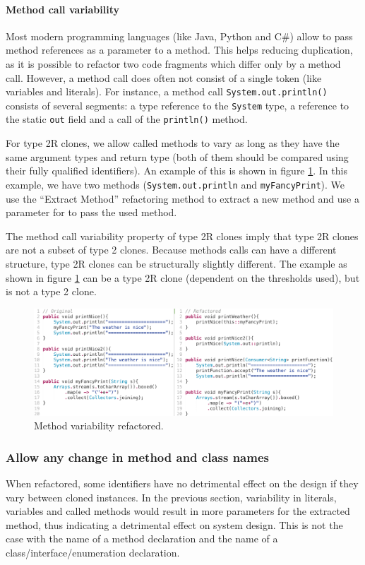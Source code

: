 \paragraph{Method call variability}
Most modern programming languages (like Java, Python and C\#) allow to pass method references as a parameter to a method. This helps reducing duplication, as it is possible to refactor two code fragments which differ only by a method call. However, a method call does often not consist of a single token (like variables and literals). For instance, a method call \texttt{System.out.println()} consists of several segments: a type reference to the \texttt{System} type, a reference to the static \texttt{out} field and a call of the \texttt{println()} method.

For type 2R clones, we allow called methods to vary as long as they have the same argument types and return type (both of them should be compared using their fully qualified identifiers). An example of this is shown in figure \ref{fig:type2method}. In this example, we have two methods (\texttt{System.out.println} and \texttt{myFancyPrint}). We use the ``Extract Method'' refactoring method to extract a new method and use a parameter for to pass the used method.

The method call variability property of type 2R clones imply that type 2R clones are not a subset of type 2 clones. Because methods calls can have a different structure, type 2R clones can be structurally slightly different. The example as shown in figure \ref{fig:type2method} can be a type 2R clone (dependent on the thresholds used), but is not a type 2 clone.

\begin{figure}[H]
  \centering
  \includegraphics[width=1\columnwidth]{img/type2method}
  \caption{Method variability refactored.}
  \label{fig:type2method}
\end{figure}

\subsubsection{Allow any change in method and class names}
When refactored, some identifiers have no detrimental effect on the design if they vary between cloned instances. In the previous section, variability in literals, variables and called methods would result in more parameters for the extracted method, thus indicating a detrimental effect on system design. This is not the case with the name of a method declaration and the name of a class/interface/enumeration declaration.

